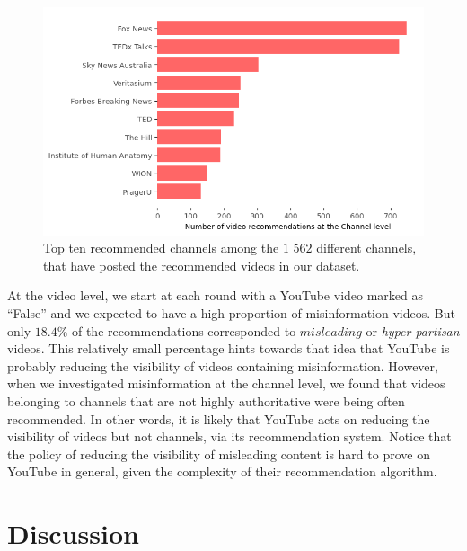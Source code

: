 \documentclass{article}
\begin{document}
\begin{figure}[h]
	\begin{center}
		\includegraphics[scale=0.6]{./img/channel_youtube.png} 
	\end{center}
	\caption{Top ten recommended channels among the $1$ $562$ different channels, that have posted the recommended videos in our dataset.}
	\label{channels_yt}
\end{figure}

\smallskip 

At the video level, we start at each round with a YouTube video marked as ``False'' and we expected to have a high proportion of misinformation videos. But only {$18.4\%$} of the recommendations corresponded to $misleading$ or {\it hyper-partisan} videos.
This relatively small percentage hints towards that idea that YouTube is probably reducing the visibility of videos containing misinformation. However, when we investigated misinformation at the channel level, we found that videos belonging to channels that are not highly authoritative were being often recommended. In other words, it is likely that YouTube acts on reducing the visibility of videos but not channels, via its recommendation system. Notice that the policy of reducing the visibility of misleading content is hard to prove on YouTube in general, given the complexity of their recommendation algorithm. %

\section{Discussion}
\end{document}
